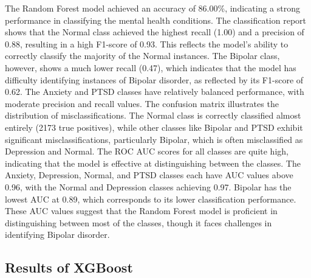\noindent
The Random Forest model achieved an accuracy of 86.00\%, indicating a strong performance in classifying the mental health conditions. The classification report shows that the Normal class achieved the highest recall (1.00) and a precision of 0.88, resulting in a high F1-score of 0.93. This reflects the model’s ability to correctly classify the majority of the Normal instances. The Bipolar class, however, shows a much lower recall (0.47), which indicates that the model has difficulty identifying instances of Bipolar disorder, as reflected by its F1-score of 0.62. The Anxiety and PTSD classes have relatively balanced performance, with moderate precision and recall values. The confusion matrix illustrates the distribution of misclassifications. The Normal class is correctly classified almost entirely (2173 true positives), while other classes like Bipolar and PTSD exhibit significant misclassifications, particularly Bipolar, which is often misclassified as Depression and Normal. The ROC AUC scores for all classes are quite high, indicating that the model is effective at distinguishing between the classes. The Anxiety, Depression, Normal, and PTSD classes each have AUC values above 0.96, with the Normal and Depression classes achieving 0.97. Bipolar has the lowest AUC at 0.89, which corresponds to its lower classification performance. These AUC values suggest that the Random Forest model is proficient in distinguishing between most of the classes, though it faces challenges in identifying Bipolar disorder.

\pagebreak

\subsection{Results of XGBoost}

